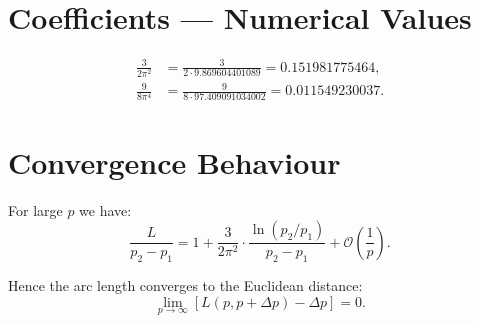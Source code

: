 \section{Coefficients --- Numerical Values}

\begin{align}
\frac{3}{2\pi^2}
&= \frac{3}{2 \cdot 9.869604401089}
= 0.151981775464, \\[6pt]
\frac{9}{8\pi^4}
&= \frac{9}{8 \cdot 97.409091034002}
= 0.011549230037.
\end{align}

\section{Convergence Behaviour}

For large $p$ we have:
\[
\frac{L}{p_2 - p_1}
= 1
+ \frac{3}{2\pi^2}
  \cdot \frac{\ln(p_2/p_1)}{p_2 - p_1}
+ \mathcal{O}\!\left(\frac{1}{p}\right).
\]

Hence the arc length converges to the Euclidean distance:
\[
\lim_{p\to\infty} \left[L(p,p+\Delta p) - \Delta p\right] = 0.
\]
